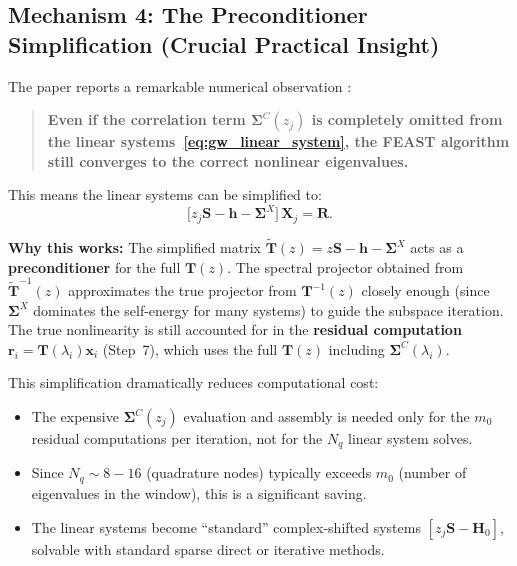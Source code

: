 \documentclass[12pt,a4paper]{article}
\theoremstyle{definition}
\newcommand{\key}[1]{\textcolor{keypoint}{\textbf{#1}}}
\begin{document}
\subsection{Mechanism 4: The Preconditioner Simplification (Crucial Practical Insight)}

The paper reports a remarkable numerical observation \cite{Li2025}:

\begin{quote}
\key{Even if the correlation term $\mathbf{\Sigma}^{C}(z_j)$ is completely omitted from the linear systems~\eqref{eq:gw_linear_system}, the FEAST algorithm still converges to the correct nonlinear eigenvalues.}
\end{quote}

This means the linear systems can be simplified to:
\begin{equation}\label{eq:simplified_system}
\boxed{\bigl[z_j\mathbf{S} - \mathbf{h} - \mathbf{\Sigma}^{X}\bigr]\,\mathbf{X}_j = \mathbf{R}}.
\end{equation}

\textbf{Why this works:} The simplified matrix $\tilde{\mathbf{T}}(z) = z\mathbf{S} - \mathbf{h} - \mathbf{\Sigma}^{X}$ acts as a \textbf{preconditioner} for the full $\mathbf{T}(z)$. The spectral projector obtained from $\tilde{\mathbf{T}}^{-1}(z)$ approximates the true projector from $\mathbf{T}^{-1}(z)$ closely enough (since $\mathbf{\Sigma}^{X}$ dominates the self-energy for many systems) to guide the subspace iteration. The true nonlinearity is still accounted for in the \textbf{residual computation} $\mathbf{r}_i = \mathbf{T}(\lambda_i)\mathbf{x}_i$ (Step~7), which uses the full $\mathbf{T}(z)$ including $\mathbf{\Sigma}^{C}(\lambda_i)$.

This simplification dramatically reduces computational cost:
\begin{itemize}
    \item The expensive $\mathbf{\Sigma}^{C}(z_j)$ evaluation and assembly is needed only for the $m_0$ residual computations per iteration, not for the $N_q$ linear system solves.
    \item Since $N_q \sim 8{-}16$ (quadrature nodes) typically exceeds $m_0$ (number of eigenvalues in the window), this is a significant saving.
    \item The linear systems become ``standard'' complex-shifted systems $[z_j\mathbf{S} - \mathbf{H}_0]$, solvable with standard sparse direct or iterative methods.
\end{itemize}
\end{document}
